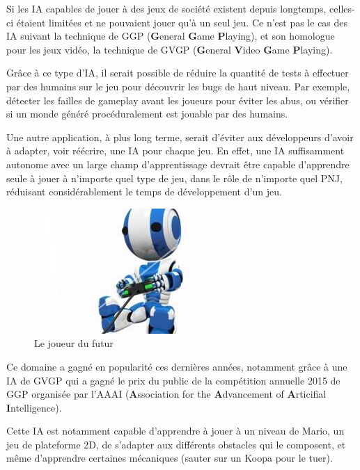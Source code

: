 \documentclass[a4paper, 12pt]{article} %
\begin{document}
Si les IA capables de jouer à des jeux de société existent depuis longtemps, celles-ci étaient limitées et ne pouvaient jouer qu’à un seul jeu. Ce n’est pas le cas des IA suivant la technique de GGP (\textbf{G}eneral \textbf{G}ame \textbf{P}laying), et son homologue pour les jeux vidéo, la technique de GVGP\cite{levine_et_al:DFU:2013:4337} (\textbf{G}eneral \textbf{V}ideo \textbf{G}ame \textbf{P}laying).

Grâce à ce type d'IA, il serait possible de réduire la quantité de tests à effectuer par des humains sur le jeu pour découvrir les bugs de haut niveau. Par exemple, détecter les failles de gameplay avant les joueurs pour éviter les abus, ou vérifier si un monde généré procéduralement est jouable par des humains.

Une autre application, à plus long terme, serait d'éviter aux développeurs d'avoir à adapter, voir réécrire, une IA pour chaque jeu. En effet, une IA suffisamment autonome avec un large champ d'apprentissage devrait être capable d'apprendre seule à jouer à n'importe quel type de jeu, dans le rôle de n'importe quel PNJ, réduisant considérablement le temps de développement d'un jeu.

\begin{figure}[!h]%
	\begin{center} 
		\includegraphics[width=0.60\columnwidth]{images/robotplaying.jpg}%
		\caption{Le joueur du futur}%
	\end{center}
\end{figure}

\newpage
Ce domaine a gagné en popularité ces dernières années, notamment grâce à une IA de GVGP qui a gagné le prix du public de la compétition annuelle 2015\cite{mariolives} de GGP organisée par l’AAAI (\textbf{A}ssociation for the \textbf{A}dvancement of \textbf{A}rticifial \textbf{I}ntelligence).

Cette IA est notamment capable d’apprendre à jouer à un niveau de Mario, un jeu de plateforme 2D, de s’adapter aux différents obstacles qui le composent, et même d’apprendre certaines mécaniques (sauter sur un Koopa pour le tuer).
\end{document}
